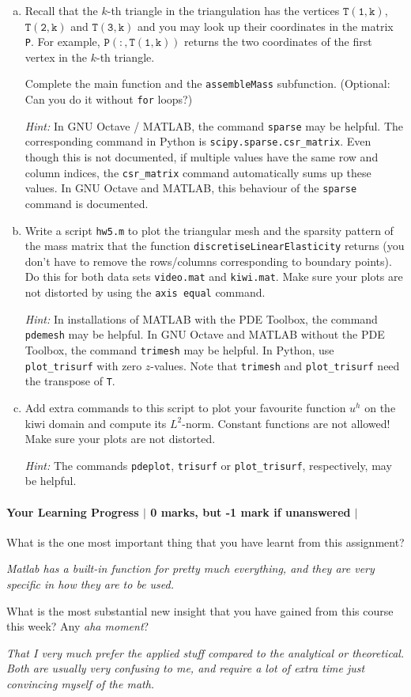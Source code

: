 \documentclass[10pt,letterpaper]{scrartcl}
\begin{document}
\begin{enumerate}[(a)]
\item Recall that the $k$-th triangle in the triangulation has the vertices $\mathtt{T(1,k)}$, $\mathtt{T(2,k)}$ and $\mathtt{T(3,k)}$ and you may look up their coordinates in the matrix \texttt{P}. For example, $\mathtt{P(:,T(1,k))}$ returns the two coordinates of the first vertex in the $k$-th triangle.

Complete the main function and the \texttt{assembleMass} subfunction. (Optional: Can you do it without \texttt{for} loops?)

\emph{Hint:} In \textsf{GNU Octave / MATLAB}, the command \texttt{sparse} may be helpful. The corresponding command in \textsf{Python} is \texttt{scipy.sparse.csr\_matrix}. Even though this is not documented, if multiple values have the same row and column indices, the \texttt{csr\_matrix} command automatically sums up these values. In \textsf{GNU Octave} and \textsf{MATLAB}, this behaviour of the \texttt{sparse} command is documented.

\item \faFilePictureO \: Write a script \texttt{hw5.m} to plot the triangular mesh and the sparsity pattern of the mass matrix that the function \texttt{discretiseLinearElasticity} returns (you don't have to remove the rows/columns corresponding to boundary points). Do this for both data sets \texttt{video.mat} and \texttt{kiwi.mat}. Make sure your plots are not distorted by using the \texttt{axis equal} command.


\emph{Hint:} In installations of \textsf{MATLAB} with the PDE Toolbox, the command \texttt{pdemesh} may be helpful. In \textsf{GNU Octave} and \textsf{MATLAB} without the PDE Toolbox, the command \texttt{trimesh} may be helpful. In \textsf{Python}, use \texttt{plot\_trisurf} with zero $z$-values. Note that \texttt{trimesh} and \texttt{plot\_trisurf} need the transpose of \texttt{T}.
\item \faFilePictureO \: Add extra commands to this script to plot your favourite function $u^h$ on the kiwi domain and compute its $L^2$-norm. Constant functions are not allowed! Make sure your plots are not distorted.

\emph{Hint:} The commands \texttt{pdeplot}, \texttt{trisurf} or \texttt{plot\_trisurf}, respectively, may be helpful.
\end{enumerate}

\paragraph*{Your Learning Progress $\vert$ 0 marks, but -1 mark if unanswered $\vert$ \faFilePdfO}
What is the one most important thing that you have learnt from this assignment?

\emph{Matlab has a built-in function for pretty much everything, and they are very specific in how they are to be used.}

What is the most substantial new insight that you have gained from this course this week? Any \emph{aha moment}?

\emph{That I very much prefer the applied stuff compared to the analytical or theoretical. Both are usually very confusing to me, and require a lot of extra time just convincing myself of the math.}
\end{document}
